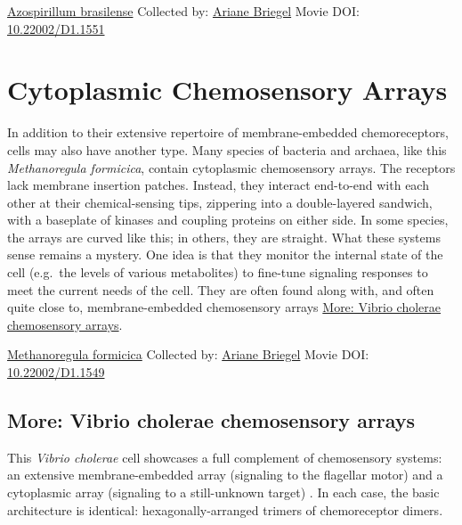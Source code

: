 \documentclass[]{tufte-book}
\begin{document}
\hypertarget{htmlwidget-042bc84cf884bbac8855}{}

\label{fig:7-4a}\protect\hyperlink{tree}{Azospirillum brasilense} Collected by: \protect\hyperlink{ariane_briegel}{Ariane Briegel} Movie DOI: \href{https://doi.org/10.22002/D1.1551}{10.22002/D1.1551}

\hypertarget{cytoplasmic-chemosensory-arrays}{%
\section{Cytoplasmic Chemosensory Arrays}\label{cytoplasmic-chemosensory-arrays}}

In addition to their extensive repertoire of membrane-embedded chemoreceptors, cells may also have another type. Many species of bacteria and archaea, like this \emph{Methanoregula formicica}, contain cytoplasmic chemosensory arrays. The receptors lack membrane insertion patches. Instead, they interact end-to-end with each other at their chemical-sensing tips, zippering into a double-layered sandwich, with a baseplate of kinases and coupling proteins on either side. In some species, the arrays are curved like this; in others, they are straight. What these systems sense remains a mystery. One idea is that they monitor the internal state of the cell (e.g.~the levels of various metabolites) to fine-tune signaling responses to meet the current needs of the cell. They are often found along with, and often quite close to, membrane-embedded chemosensory arrays \protect\hyperlink{Vibrio_cholerae_chemosensory_arrays}{More: Vibrio cholerae chemosensory arrays}.



\hypertarget{htmlwidget-8a8db8b5f86144311e55}{}

\label{fig:7-5}\protect\hyperlink{tree}{Methanoregula formicica} Collected by: \protect\hyperlink{ariane_briegel}{Ariane Briegel} Movie DOI: \href{https://doi.org/10.22002/D1.1549}{10.22002/D1.1549}

\hypertarget{Vibrio_cholerae_chemosensory_arrays}{%
\subsection*{More: Vibrio cholerae chemosensory arrays}\label{Vibrio_cholerae_chemosensory_arrays}}

This \emph{Vibrio cholerae} cell showcases a full complement of chemosensory systems: an extensive membrane-embedded array (signaling to the flagellar motor) and a cytoplasmic array (signaling to a still-unknown target) . In each case, the basic architecture is identical: hexagonally-arranged trimers of chemoreceptor dimers.
\end{document}
